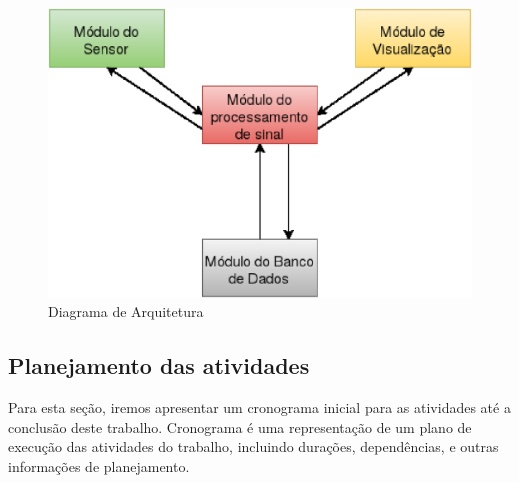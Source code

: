 \begin{figure}[!h]                                                           
\centering                                                                   
\includegraphics [keepaspectratio=true,scale=0.60]{figuras/diagrama.eps} 
\caption{Diagrama de Arquitetura}                                   
\label{diagrama}                                     
                                                                             
\end{figure}                                                                 
  
\subsection{Planejamento das atividades}
\label{Sec:Planejamento}
  Para esta seção, iremos apresentar um cronograma inicial para as atividades
até a conclusão deste trabalho. Cronograma  é uma representação de um plano de 
execução das atividades do trabalho, incluindo durações, dependências, e outras 
informações de planejamento.

